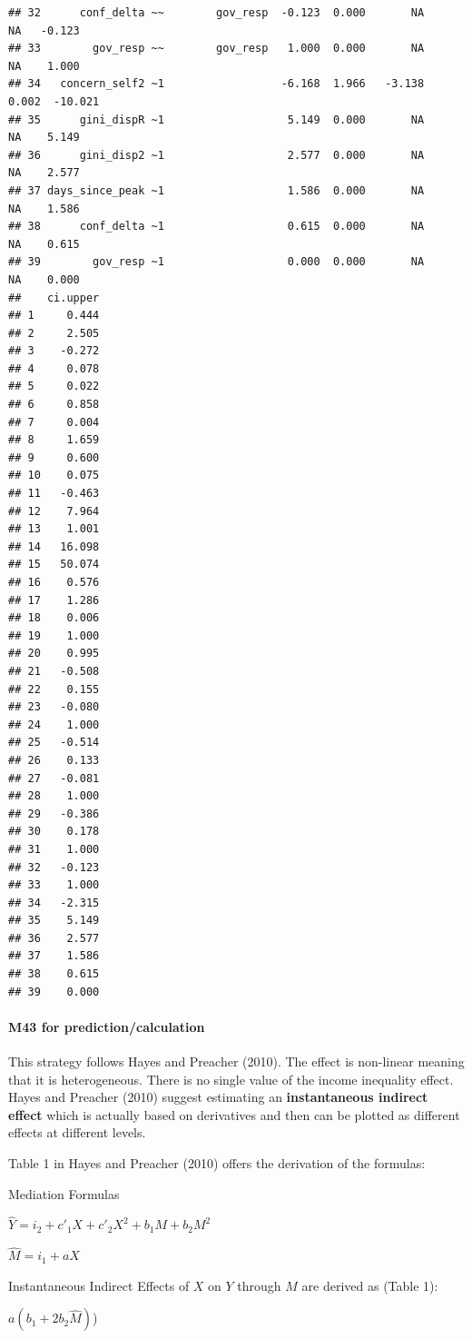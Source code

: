 \documentclass[
]{article}
\begin{document}
\begin{verbatim}
## 32      conf_delta ~~        gov_resp  -0.123  0.000       NA     NA   -0.123
## 33        gov_resp ~~        gov_resp   1.000  0.000       NA     NA    1.000
## 34   concern_self2 ~1                  -6.168  1.966   -3.138  0.002  -10.021
## 35      gini_dispR ~1                   5.149  0.000       NA     NA    5.149
## 36      gini_disp2 ~1                   2.577  0.000       NA     NA    2.577
## 37 days_since_peak ~1                   1.586  0.000       NA     NA    1.586
## 38      conf_delta ~1                   0.615  0.000       NA     NA    0.615
## 39        gov_resp ~1                   0.000  0.000       NA     NA    0.000
##    ci.upper
## 1     0.444
## 2     2.505
## 3    -0.272
## 4     0.078
## 5     0.022
## 6     0.858
## 7     0.004
## 8     1.659
## 9     0.600
## 10    0.075
## 11   -0.463
## 12    7.964
## 13    1.001
## 14   16.098
## 15   50.074
## 16    0.576
## 17    1.286
## 18    0.006
## 19    1.000
## 20    0.995
## 21   -0.508
## 22    0.155
## 23   -0.080
## 24    1.000
## 25   -0.514
## 26    0.133
## 27   -0.081
## 28    1.000
## 29   -0.386
## 30    0.178
## 31    1.000
## 32   -0.123
## 33    1.000
## 34   -2.315
## 35    5.149
## 36    2.577
## 37    1.586
## 38    0.615
## 39    0.000
\end{verbatim}

\hypertarget{m43-for-predictioncalculation}{%
\paragraph{M43 for
prediction/calculation}\label{m43-for-predictioncalculation}}

This strategy follows Hayes and Preacher (2010). The effect is
non-linear meaning that it is heterogeneous. There is no single value of
the income inequality effect. Hayes and Preacher (2010) suggest
estimating an \textbf{instantaneous indirect effect} which is actually
based on derivatives and then can be plotted as different effects at
different levels.

Table 1 in Hayes and Preacher (2010) offers the derivation of the
formulas:

Mediation Formulas

\(\hat{Y} = i_{2} + c'_{1}X + c'_{2}X^{2} + b_{1}M + b_{2}M^{2}\)

\(\hat{M} = i_{1} + aX\)

Instantaneous Indirect Effects of \(X\) on \(Y\) through \(M\) are
derived as (Table 1):

\(a(b_{1} + 2b_{2}\hat{M})\))
\end{document}

